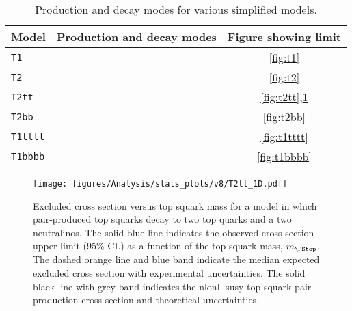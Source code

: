 \begin{table}[h!]
  \caption{Production and decay modes for various simplified models.}
  \label{tab:sms}
  \centering
  \footnotesize
  \begin{tabular}{ llc }
    \hline
    Model & Production and decay modes & Figure showing limit \\ [0.5ex]
    \hline
    \texttt{T1} & \HepProcess{\PSgluino\PSgluino\to\Pquark\APquark\PSneutralino\Pquark\APquark\PSneutralino} & \ref{fig:t1} \\
    \texttt{T2} & \HepProcess{\Psquark\Psquark\to\Pquark\PSneutralino\APquark\PSneutralino} & \ref{fig:t2} \\
    \texttt{T2tt} & \HepProcess{\PStop\PStop\to\Ptop\PSneutralino\APtop\PSneutralino} & \ref{fig:t2tt},\ref{fig:t2tt-mlsp50} \\
    \texttt{T2bb} & \HepProcess{\PSbottom\PSbottom\to\Pbottom\PSneutralino\APbottom\PSneutralino} & \ref{fig:t2bb} \\
    \texttt{T1tttt} & \HepProcess{\PSgluino\PSgluino\to\Ptop\APtop\PSneutralino\Ptop\APtop\PSneutralino} & \ref{fig:t1tttt} \\
    \texttt{T1bbbb} & \HepProcess{\PSgluino\PSgluino\to\Pbottom\APbottom\PSneutralino\Pbottom\APbottom\PSneutralino} & \ref{fig:t1bbbb} \\
    \hline
  \end{tabular}
\end{table}


\begin{figure}[t!]
  \begin{center}
    \texttt{[image: figures/Analysis/stats\_plots/v8/T2tt\_1D.pdf]}
    \caption{\label{fig:t2tt-mlsp50} Excluded cross section versus top
      squark mass for a model in which pair-produced top squarks decay
      to two top quarks and a two neutralinos. The solid blue line
      indicates the observed cross section upper limit (95\% CL) as a
      function of the top squark mass, $m_{\PStop}$. The dashed orange
      line and blue band indicate the median expected excluded cross
      section with experimental uncertainties. The solid black line
      with grey band indicates the \ac{nlonll} \ac{susy} top squark
      pair-production cross section and theoretical uncertainties.}
  \end{center}
\end{figure}




